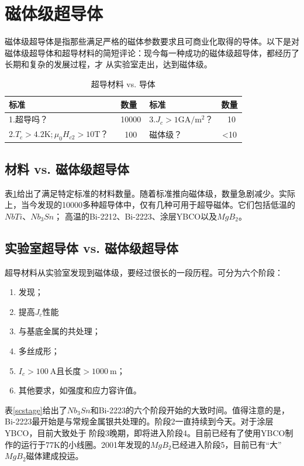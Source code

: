 \section{磁体级超导体}
磁体级超导体是指那些满足严格的磁体参数要求且可商业化取得的导体。以下是对磁体级超导体和超导材料的简短评论：现今每一种成功的磁体级超导体，都经历了长期和复杂的发展过程，才
从实验室走出，达到磁体级。
\begin{table}[htbp]\small
  \centering
  \caption{超导材料 vs. 导体} \label{scmaterialvsconductor}
\begin{tabular}{|l|c||l|c|}
  \hline
  标准 & 数量 & 标准 & 数量 \\ \hline \hline
  1.超导吗？ & ~10000 & 3.$J_c>1\mathrm{GA/m^2}$？ & ~10 \\ \hline
  2.$T_c> 4.2\mathrm{K};\mu_0 H_{c2}>10\mathrm{T}$？ &~100 & 磁体级？ & <10 \\
  \hline
\end{tabular}
\end{table}

\subsection{材料 vs. 磁体级超导体}
表\ref{scmaterialvsconductor}给出了满足特定标准的材料数量。随着标准推向磁体级，数量急剧减少。实际上，当今发现的10000多种超导体中，仅有几种可用于超导磁体。它们包括低温的$NbTi$、$Nb_3Sn$；
高温的Bi-2212、Bi-2223、涂层YBCO以及$MgB_2$。

\subsection{实验室超导体 vs. 磁体级超导体}
超导材料从实验室发现到磁体级，要经过很长的一段历程。可分为六个阶段：
\begin{enumerate}
  \item 发现；
  \item 提高$J_c$性能
  \item 与基底金属的共处理；
  \item 多丝成形；
  \item $I_c>100\ \mathrm{A}$且长度$>1000\ \mathrm{m}$；
  \item 其他要求，如强度和应力容许值。
\end{enumerate}

表\ref{scstage}给出了$Nb_3Sn$和Bi-2223的六个阶段开始的大致时间。值得注意的是，Bi-2223最开始是与常规金属银共处理的。阶段2一直持续到今天。对于涂层YBCO，目前大致处于
阶段3晚期，即将进入阶段4。目前已经有了使用YBCO制作的运行于77K的小线圈。2001年发现的$MgB_2$已经进入阶段5，目前已有“大”$MgB_2$磁体建成投运。

